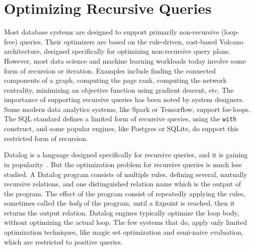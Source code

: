 \chapter{Optimizing Recursive Queries}
\label{chapter:fgh}

Most database systems are designed to support primarily non-recursive
(loop-free) queries.  Their optimizers are based on the rule-driven,
cost-based Volcano architecture, designed specifically for optimizing
non-recursive query plans.  However, most data science and machine
learning workloads today involve some form of recursion or iteration.
Examples include finding the connected components of a graph,
computing the page rank, computing the network centrality, minimizing
an objective function using gradient descent, etc.  The importance of
supporting recursive queries has been noted by system designers.
Some modern data analytics systems, like Spark or Tensorflow, support
for-loops. The SQL standard defines a limited
form of recursive queries, using the
\texttt{with} construct, and some popular engines, like Postgres or
SQLite, do support this restricted form of recursion.

%
Datalog is a language
designed specifically for recursive queries, and it is gaining in
popularity~\cite{DBLP:conf/datalog/AlvaroMCHMS10,
DBLP:reference/db/RoscoeL18,
10.1145/3452021.3458815,
10.1145/1989323.1989456,
BigDatalog,
DBLP:journals/pvldb/FanZZAKP19,
DBLP:journals/tkde/SeoGL15,
10.14778/2824032.2824052,
francislandau-vieira-eisner-2020-wrla}.
But the optimization problem for recursive queries is
much less studied.  A  Datalog program consists of multiple rules,
defining several, mutually recursive relations, and one
distinguished relation name which is the output of the program.  The
effect of the program consist of repeatedly applying the rules,
sometimes called the {\em body} of the program, until a fixpoint is
reached, then it returns the output relation.
Datalog engines typically optimize the loop body, without optimizing
the actual loop.  The few systems that do,
apply only limited optimization techniques, like magic set optimization and
semi-naive evaluation, which are restricted to positive queries.

